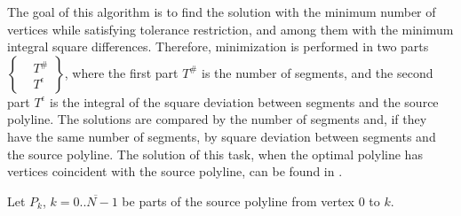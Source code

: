 \documentclass[conference]{IEEEtran}
\begin{document}
The goal of this algorithm is to find the solution with the minimum number of vertices while satisfying tolerance restriction, and among them with the minimum integral square differences. Therefore, minimization is performed in two parts
$
  \left\{
    \begin{aligned}
      & T^{\#}\\
      & T^{\epsilon}
    \end{aligned}
  \right\}
$,
where the first part $T^{\#}$ is the number of segments, and the second part $T^{\epsilon}$ is the integral of the square deviation between segments and the source polyline. The solutions are compared by the number of segments and, if they have the same number of segments, by square deviation between segments and the source polyline. The solution of this task, when the optimal polyline has vertices coincident with the source polyline, can be found in \cite{CombinatorialMinimumNumberSegments}.

Let $P_k$, $k = \overline{0..N - 1}$ be parts of the source polyline from vertex $0$ to $k$.
\end{document}

